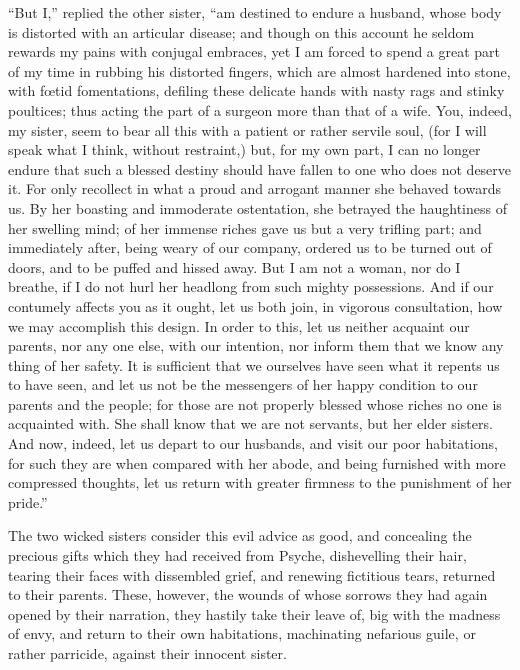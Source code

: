 \documentclass[12pt]{article}
\begin{document}
``But I,'' replied the other sister, ``am destined to endure a husband, whose
body is distorted with an articular disease; and though on this account he
seldom rewards my pains with conjugal embraces, yet I am forced to spend a
great part of my time in rubbing his distorted fingers, which are almost
hardened into stone, with f{\oe}tid fomentations, defiling these delicate hands
with nasty rags and stinky poultices; thus acting the part of a surgeon more
than that of a wife. You, indeed, my sister, seem to bear all this with a
patient or rather servile soul, (for I will speak what I think, without
restraint,) but, for my own part, I can no longer endure that such a blessed
destiny should have fallen to one who does not deserve it. For only recollect
in what a proud and arrogant manner she behaved towards us. By her boasting and
immoderate ostentation, she betrayed the haughtiness of her swelling mind; of
her immense riches gave us but a very trifling part; and immediately after,
being weary of our company, ordered us to be turned out of doors, and to be
puffed and hissed away. But I am not a woman, nor do I breathe, if I do not
hurl her headlong from such mighty possessions. And if our contumely affects
you as it ought, let us both join, in vigorous consultation, how we may
accomplish this design. In order to this, let us neither acquaint our parents,
nor any one else, with our intention, nor inform them that we know any thing of
her safety. It is sufficient that we ourselves have seen what it repents us to
have seen, and let us not be the messengers of her happy condition to our
parents and the people; for those are not properly blessed whose riches no one
is acquainted with. She shall know that we are not servants, but her elder
sisters. And now, indeed, let us depart to our husbands, and visit our poor
habitations, for such they are when compared with her abode, and being
furnished with more compressed thoughts, let us return with greater firmness to
the punishment of her pride.''

The two wicked sisters consider this evil advice as good, and concealing the
precious gifts which they had received from Psyche, dishevelling their hair,
tearing their faces with dissembled grief, and renewing fictitious tears,
returned to their parents. These, however, the wounds of whose sorrows they had
again opened by their narration, they hastily take their leave of, big with the
madness of envy, and return to their own habitations, machinating nefarious
guile, or rather parricide, against their innocent sister.
\end{document}
